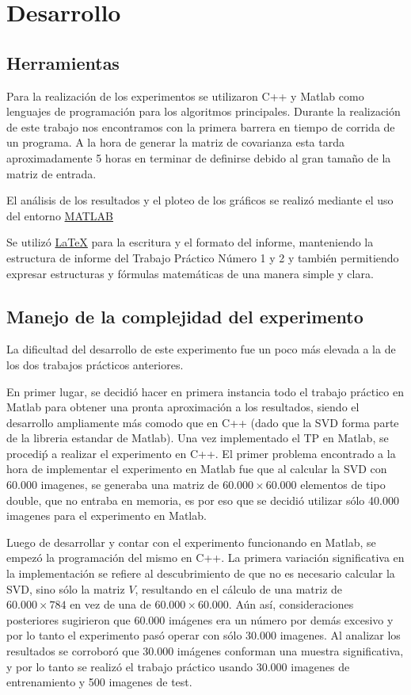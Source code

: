 \section{Desarrollo}

\subsection{Herramientas}

Para la realizaci\'on de los experimentos se utilizaron C++ y Matlab como lenguajes de
programaci\'on para los algoritmos principales. Durante la realizaci\'on de este trabajo nos encontramos con
la primera barrera en tiempo de corrida de un programa. A la hora de generar la
matriz de covarianza esta tarda aproximadamente 5 horas en terminar de definirse
debido al gran tama\~no de la matriz de entrada.

El an\'alisis de los resultados y el ploteo de los gr\'aficos se realiz\'o
mediante el uso del entorno \href{http://www.matlab.com/}{MATLAB}

Se utiliz\'o \href{http://www.latex-project.org/}{\LaTeX} para la escritura y el formato del informe,
manteniendo la estructura de informe del Trabajo Pr\'actico N\'umero 1 y 2 y tambi\'en
permitiendo expresar estructuras y f\'ormulas matem\'aticas de una manera simple y clara.

\subsection{Manejo de la complejidad del experimento}

La dificultad del desarrollo de este experimento fue un poco m\'as elevada a la de los dos
trabajos pr\'acticos anteriores.

En primer lugar, se decidi\'o hacer en primera instancia todo el trabajo pr\'actico en Matlab para obtener
una pronta aproximaci\'on a los resultados, siendo el desarrollo ampliamente m\'as comodo que
en C++ (dado que la SVD forma parte de la libreria estandar de Matlab). Una vez implementado
el TP en Matlab, se procedi\'p a realizar el experimento en C++. El primer problema encontrado
a la hora de implementar el experimento en Matlab fue que al calcular la SVD con 60.000 imagenes,
se generaba una matriz de $60.000 \times 60.000$ elementos de tipo double, que no entraba en
memoria, es por eso que se decidi\'o utilizar s\'olo 40.000 imagenes para el experimento en Matlab.

Luego de desarrollar y contar con el experimento funcionando en Matlab, se empez\'o la programaci\'on
del mismo en C++. La primera variaci\'on significativa en la implementaci\'on se refiere al
descubrimiento de que no es necesario calcular la SVD, sino s\'olo la matriz $V$, resultando
en el c\'alculo de una matriz de $60.000 \times 784$ en vez de una de $60.000 \times 60.000$.
A\'un as\'i, consideraciones posteriores sugirieron que 60.000 im\'agenes era un n\'umero por
dem\'as excesivo y por lo tanto el experimento pas\'o operar con s\'olo 30.000 imagenes.
Al analizar los resultados se corrobor\'o que 30.000 im\'agenes conforman una muestra significativa,
y por lo tanto se realiz\'o el trabajo pr\'actico usando 30.000 imagenes de entrenamiento y 500 imagenes de test.

